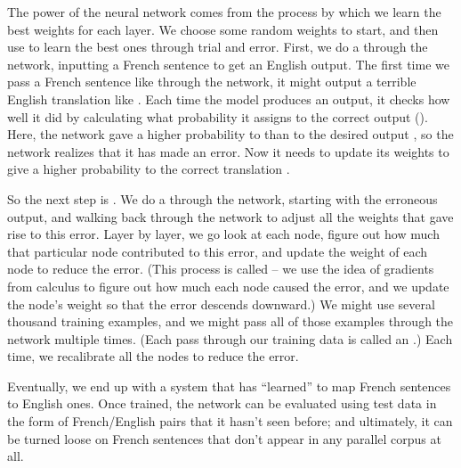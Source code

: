 The power of the neural network comes from the process by which we learn the best weights for each layer.  We choose some random weights to start, and then use  to learn the best ones through trial and error.  First, we do a  through the network, inputting a French sentence to get an English output.  The first time we pass a French sentence like  through the network, it might output a terrible English translation like .  
Each time the model produces an output, it checks how well it did by calculating what probability it assigns to the correct output ().  Here, the network gave a higher probability to  than to the desired output , so the network realizes that it has made an error.   Now it needs to update its weights to give a higher probability to the correct translation . 

So the next step is .  We do a  through the network, starting with the erroneous output, and walking back through the network to adjust all the weights that gave rise to this error.  Layer by layer, we go look at each node,  figure out how much that particular node contributed to this error, and update the weight of each node to reduce the error.  (This process is called  -- we use the idea of gradients from calculus to figure out how much each node caused the error, and we update the node's weight so that the error descends downward.)   We might use several thousand training examples, and we might pass all of those examples through the network multiple times.  (Each pass through our training data is called an .)   Each time, we recalibrate all the nodes to reduce the error.    

Eventually, we end up with a system that has ``learned'' to map French sentences to English ones.  Once trained, the network can be evaluated using test data in the form of  French/English pairs that it hasn't seen before; and ultimately, it can be turned loose on French sentences that don't appear in any parallel corpus at all.  



